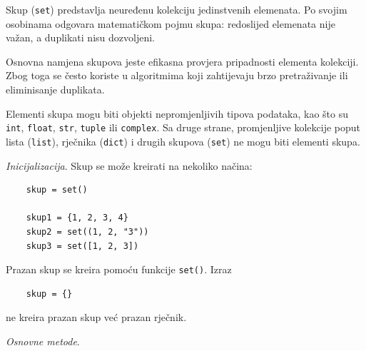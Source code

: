 Skup (\texttt{set}) predstavlja neuređenu kolekciju jedinstvenih elemenata. Po svojim osobinama odgovara matematičkom pojmu skupa: redoslijed elemenata nije važan, a duplikati nisu dozvoljeni.

Osnovna namjena skupova jeste efikasna provjera pripadnosti elementa kolekciji. Zbog toga se često koriste u algoritmima koji zahtijevaju brzo pretraživanje ili eliminisanje duplikata.

Elementi skupa mogu biti objekti nepromjenljivih tipova podataka, kao što su \texttt{int}, \texttt{float}, \texttt{str}, \texttt{tuple} ili \texttt{complex}. Sa druge strane, promjenljive kolekcije poput lista (\texttt{list}), rječnika (\texttt{dict}) i drugih skupova (\texttt{set}) ne mogu biti elementi skupa.

\textit{Inicijalizacija}.  Skup se može kreirati na nekoliko načina:

\begin{verbatim}
	skup = set()
	
	skup1 = {1, 2, 3, 4}
	skup2 = set((1, 2, "3"))  
	skup3 = set([1, 2, 3])
\end{verbatim}

 Prazan skup se kreira pomoću funkcije \texttt{set()}. Izraz
\begin{verbatim}
	skup = {}
\end{verbatim}

ne kreira prazan skup već prazan rječnik.

\textit{Osnovne metode}. 

